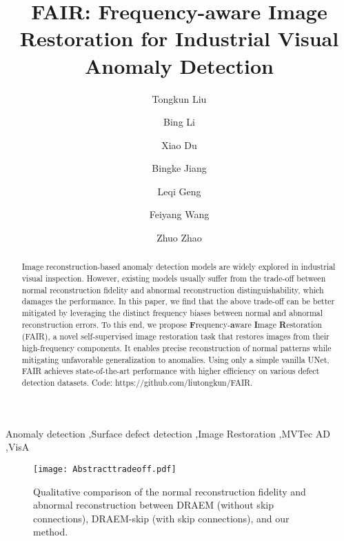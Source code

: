 \documentclass[5p, twocolumn]{elsarticle}[draft]
\begin{document}
\begin{frontmatter}
\title{FAIR: Frequency-aware Image Restoration for Industrial Visual Anomaly Detection}
\author[Address1]{Tongkun Liu}
\author[Address1,Address2]{Bing Li}
\author[Address1]{Xiao Du}
\author[Address1]{Bingke Jiang}
\author[Address1]{Leqi Geng}
\author[Address3]{Feiyang Wang}
\author[Address1]{Zhuo Zhao}
\address[Address1]{State Key Laboratory for Manufacturing System Engineering, Xi’an Jiaotong University, No.99 Yanxiang Road, Yanta District, 710054, Xi’an, Shaanxi, China}


\address[Address2]{International Joint Research Laboratory for Micro/Nano Manufacturing and Measurement Technologies, Xi’an Jiaotong University, No.99 Yanxiang Road, Yanta District, 710054, Xi’an, Shaanxi, China}

\address[Address3]{Anhui Province Key Laboratory of Machine Vision Inspection, Yangtze River Delta HIT Robot Technology Research Institute, Wuhu,24100, China}

       
\begin{abstract}
Image reconstruction-based anomaly detection models are widely explored in industrial visual inspection. However, existing models usually suffer from the trade-off between normal reconstruction fidelity and abnormal reconstruction distinguishability, which damages the performance. In this paper, we find that the above trade-off can be better mitigated by leveraging the distinct frequency biases between normal and abnormal reconstruction errors. To this end, we propose \textbf{F}requency-\textbf{a}ware \textbf{I}mage \textbf{R}estoration (FAIR), a novel self-supervised image restoration task that restores images from their high-frequency components. It enables precise reconstruction of normal patterns while mitigating unfavorable generalization to anomalies. Using only a simple vanilla UNet, FAIR achieves state-of-the-art performance with higher efficiency on various defect detection datasets. Code: https://github.com/liutongkun/FAIR.
 

\end{abstract}

\begin{keyword}
Anomaly detection \sep Surface defect detection \sep Image Restoration \sep MVTec AD \sep VisA 
\end{keyword}



\end{frontmatter}
\begin{figure}[h]
    \centering
		\texttt{[image: Abstracttradeoff.pdf]}
	\caption{Qualitative comparison of the normal reconstruction fidelity and abnormal reconstruction between DRAEM \cite{zavrtanik2021draem} (without skip connections), DRAEM-skip (with skip connections), and our method.}
	\label{Abstracttradeoff}
\end{figure}   
\end{document}
